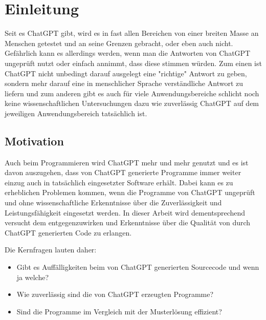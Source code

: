 \documentclass[class=scrbook, crop=false]{standalone}
\begin{document}
\chapter{Einleitung}
\label{ch::einleitung}
    Seit es ChatGPT gibt, wird es in fast allen Bereichen von einer breiten Masse an Menschen getestet und an seine Grenzen gebracht, oder eben auch nicht.
    Gefährlich kann es allerdings werden, wenn man die Antworten von ChatGPT ungeprüft nutzt oder einfach annimmt, dass diese stimmen würden.
    Zum einen ist ChatGPT nicht unbedingt darauf ausgelegt eine "richtige" Antwort zu geben, sondern mehr darauf eine in menschlicher Sprache verständliche
    Antwort zu liefern und zum anderen gibt es auch für viele Anwendungsbereiche schlicht noch keine wissenschaftlichen
    Untersuchungen dazu wie zuverlässig ChatGPT auf dem jeweiligen Anwendungsbereich tatsächlich ist.

\section{Motivation}
\label{sec:motivation}
    Auch beim Programmieren wird ChatGPT mehr und mehr genutzt und es ist davon auszugehen, dass von ChatGPT generierte
    Programme immer weiter einzug auch in tatsächlich eingesetzter Software erhält.
    Dabei kann es zu erheblichen Problemen kommen, wenn die Programme von ChatGPT ungeprüft und ohne wissenschaftliche
    Erkenntnisse über die Zuverlässigkeit und Leistungsfähigkeit eingesetzt werden.
    In dieser Arbeit wird dementsprechend versucht dem entgegenzuwirken und Erkenntnisse über die Qualität von durch
    ChatGPT generierten Code zu erlangen.

    Die Kernfragen lauten daher:
    \begin{itemize}
        \item Gibt es Auffälligkeiten beim von ChatGPT generierten Sourcecode und wenn ja welche?
        \item Wie zuverlässig sind die von ChatGPT erzeugten Programme?
        \item Sind die Programme im Vergleich mit der Musterlösung effizient?
    \end{itemize}

\ifstandalone
    \printglossary
    \printbibliography[heading=bibintoc]
\fi
\end{document}
